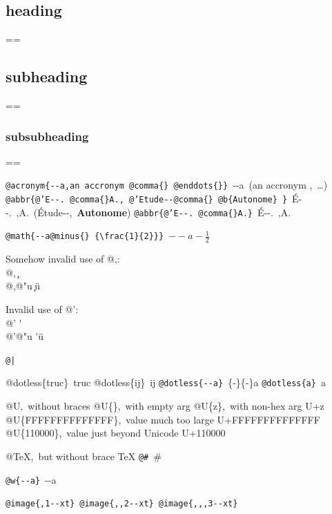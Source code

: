 \documentclass{book}
\makeatletter
\newenvironment{Texinfopreformatted}{%
  \par\GNUTobeylines\obeyspaces\frenchspacing\parskip=\z@\parindent=\z@}{}
{\catcode`\^^M=13 \gdef\GNUTobeylines{\catcode`\^^M=13 \def^^M{\null\par}}}
\newenvironment{Texinfoindented}{\begin{list}{}{}\item\relax}{\end{list}}
\renewcommand{\_}{\Texinfounderscore\discretionary{}{}{}}
\makeatother
\begin{document}
\begin{Texinfoindented}
\section*{{heading}}
\begin{Texinfopreformatted}%
\ttfamily 
\end{Texinfopreformatted}
\subsection*{{subheading}}
\begin{Texinfopreformatted}%
\ttfamily 
\end{Texinfopreformatted}
\subsubsection*{{subsubheading}}
\begin{Texinfopreformatted}%
\ttfamily 

\texttt{@acronym\{{-}{-}a,an accronym @comma\{\}\ @enddots\{\}\}}\ {-}{-}a\ (an accronym ,\ \dots{})
\texttt{@abbr\{@'E{-}{-}.\ @comma\{\}A.,\ @'Etude{-}{-}@comma\{\}\ @b\{Autonome\}\ \}}\ \'{E}{-}{-}.\@\ ,A.\@\ (\'{E}tude{-}{-},\ \textbf{Autonome})
\texttt{@abbr\{@'E{-}{-}.\ @comma\{\}A.\}}\ \'{E}{-}{-}.\@\ ,A.\@

\texttt{@math\{{-}{-}a@minus\{\}\ \{\textbackslash{}frac\{1\}\{2\}\}\}}\ $--a- {\frac{1}{2}}$




Somehow invalid use of @,:\leavevmode{}\\
@,\ \c{}\leavevmode{}\\
@,@"u \c{}\"{u}

Invalid use of @':\leavevmode{}\\
@' \'{}\leavevmode{}\\
@'@"u \'{}\"{u}

\texttt{@|}\ 

@dotless\{truc\}\ truc
@dotless\{ij\}\ ij
\texttt{@dotless\{{-}{-}a\}}\ \{-\}\{-\}a
\texttt{@dotless\{a\}}\ a

@U,\ without braces @U\{\},\ with empty arg 
@U\{z\},\ with non-hex arg U+z
@U\{FFFFFFFFFFFFFF\},\ value much too large U+FFFFFFFFFFFFFF
@U\{110000\},\ value just beyond Unicode U+110000

@TeX,\ but without brace \TeX{}
\texttt{@\#}\ \#

\texttt{@w\{{-}{-}a\}}\ \hbox{{-}{-}a}

\texttt{@image\{,1{-}{-}xt\}}\ 
\texttt{@image\{{,}{,}2{-}{-}xt\}}\ 
\texttt{@image\{{,}{,},3{-}{-}xt\}}\ 


\end{Texinfopreformatted}
\end{Texinfoindented}
\end{document}
